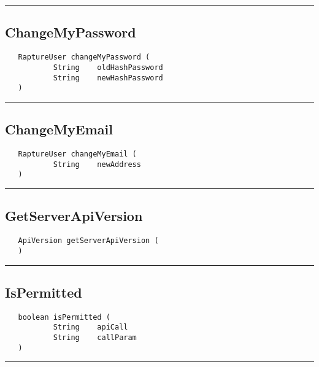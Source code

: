 \rule{15cm}{2pt}
\subsection{ChangeMyPassword}
\label{Api:ChangeMyPassword}
\begin{verbatim}
   RaptureUser changeMyPassword (
           String    oldHashPassword
           String    newHashPassword
   )
\end{verbatim}



\rule{15cm}{2pt}
\subsection{ChangeMyEmail}
\label{Api:ChangeMyEmail}
\begin{verbatim}
   RaptureUser changeMyEmail (
           String    newAddress
   )
\end{verbatim}



\rule{15cm}{2pt}
\subsection{GetServerApiVersion}
\label{Api:GetServerApiVersion}
\begin{verbatim}
   ApiVersion getServerApiVersion (
   )
\end{verbatim}



\rule{15cm}{2pt}
\subsection{IsPermitted}
\label{Api:IsPermitted}
\begin{verbatim}
   boolean isPermitted (
           String    apiCall
           String    callParam
   )
\end{verbatim}



\rule{15cm}{2pt}
